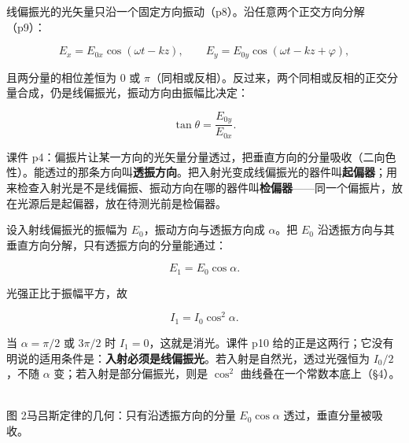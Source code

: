 \documentclass[11pt]{ctexart}
\begin{document}

线偏振光的光矢量只沿一个固定方向振动（p8）。沿任意两个正交方向分解（p9）：

\[
E_x=E_{0x}\cos(\omega t-kz),\qquad
E_y=E_{0y}\cos(\omega t-kz+\varphi),
\]

且两分量的相位差恒为 $0$ 或 $\pi$（同相或反相）。反过来，两个同相或反相的正交分量合成，仍是线偏振光，振动方向由振幅比决定：

\[
\tan\theta=\frac{E_{0y}}{E_{0x}}.
\]



课件 p4：偏振片让某一方向的光矢量分量透过，把垂直方向的分量吸收（二向色性）。能透过的那条方向叫\textbf{透振方向}。把入射光变成线偏振光的器件叫\textbf{起偏器}；用来检查入射光是不是线偏振、振动方向在哪的器件叫\textbf{检偏器}——同一个偏振片，放在光源后是起偏器，放在待测光前是检偏器。


设入射线偏振光的振幅为 $E_0$，振动方向与透振方向成 $\alpha$。把 $E_0$ 沿透振方向与其垂直方向分解，只有透振方向的分量能通过：

\[
E_1=E_0\cos\alpha .
\]

光强正比于振幅平方，故

\[
I_1=I_0\cos^2\alpha .
\]

当 $\alpha=\pi/2$ 或 $3\pi/2$ 时 $I_1=0$，这就是消光。课件 p10 给的正是这两行；它没有明说的适用条件是：\textbf{入射必须是线偏振光}。若入射是自然光，透过光强恒为 $I_0/2$，不随 $\alpha$ 变；若入射是部分偏振光，则是 $\cos^2$ 曲线叠在一个常数本底上（§4）。

\begin{center}
\\[2pt]
{\small\color{inkgray} 图 2\quad 马吕斯定律的几何：只有沿透振方向的分量 $E_0\cos\alpha$ 透过，垂直分量被吸收。}
\end{center}
\end{document}
